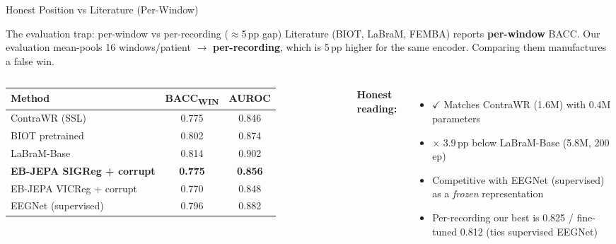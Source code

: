 \documentclass[aspectratio=169,10pt]{beamer}
\begin{document}
\begin{frame}{Honest Position vs Literature (Per-Window)}

\begin{alertblock}{The evaluation trap: per-window vs per-recording ($\approx$5\,pp gap)}
Literature (BIOT, LaBraM, FEMBA) reports \textbf{per-window} BACC.
Our evaluation mean-pools 16 windows/patient $\to$ \textbf{per-recording}, which is 5\,pp higher for the same encoder. Comparing them manufactures a false win.
\end{alertblock}

\vspace{0.5em}
\begin{columns}[T]
\begin{tabular}{lcc}
\toprule
Method & BACC\textsubscript{WIN} & AUROC \\
\midrule
\textcolor{muted}{ContraWR (SSL)} & \textcolor{muted}{0.775} & \textcolor{muted}{0.846} \\
\textcolor{accent}{BIOT pretrained} & \textcolor{accent}{0.802} & \textcolor{accent}{0.874} \\
\textcolor{accent}{LaBraM-Base} & \textcolor{accent}{0.814} & \textcolor{accent}{0.902} \\
\midrule
\textbf{EB-JEPA SIGReg + corrupt} & \textbf{0.775} & \textbf{0.856} \\
EB-JEPA VICReg + corrupt & 0.770 & 0.848 \\
EEGNet (supervised) & 0.796 & 0.882 \\
\bottomrule
\end{tabular}

\textbf{Honest reading:}
\begin{itemize}
  \item \textcolor{good}{$\checkmark$} Matches ContraWR (1.6M) with 0.4M parameters
  \item \textcolor{warn}{$\times$} 3.9\,pp below LaBraM-Base (5.8M, 200 ep)
  \item Competitive with EEGNet (supervised) as a \emph{frozen} representation
  \item Per-recording our best is 0.825 / fine-tuned 0.812 (ties supervised EEGNet)
\end{itemize}
\end{columns}
\end{frame}
\end{document}
